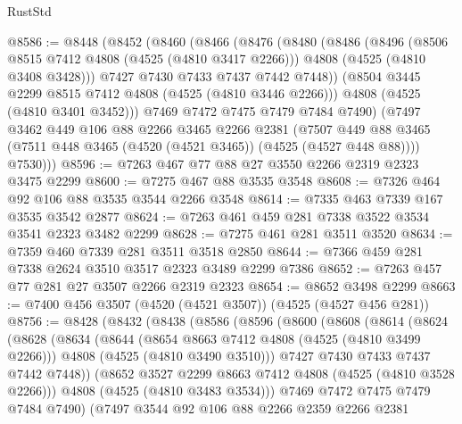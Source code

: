 \begin{lexlean}{RustStd}
\begin{coremodule}
{\begin{coremodule}
{{{{{{{{{{{{{{@8586 := @8448
    (@8452
      (@8460
        (@8466
          (@8476
            (@8480
              (@8486
                (@8496
                  (@8506 @8515 @7412 @4808 (@4525 (@4810 @3417 @2266)))
                  @4808
                  (@4525 (@4810 @3408 @3428)))
                @7427
                @7430
                @7433
                @7437
                @7442
                @7448))
            (@8504 @3445 @2299 @8515 @7412 @4808 (@4525 (@4810 @3446 @2266)))
            @4808
            (@4525 (@4810 @3401 @3452)))
          @7469
          @7472
          @7475
          @7479
          @7484
          @7490)
        (@7497
          @3462
          @449
          @106
          @88
          @2266
          @3465
          @2266
          @2381
          (@7507 @449 @88 @3465 (@7511 @448 @3465 (@4520 (@4521 @3465)) (@4525 (@4527 @448 @88))))
          @7530)))
@8596 := @7263 @467 @77 @88 @27 @3550 @2266 @2319 @2323 @3475 @2299
@8600 := @7275 @467 @88 @3535 @3548
@8608 := @7326 @464 @92 @106 @88 @3535 @3544 @2266 @3548
@8614 := @7335 @463 @7339 @167 @3535 @3542 @2877
@8624 := @7263 @461 @459 @281 @7338 @3522 @3534 @3541 @2323 @3482 @2299
@8628 := @7275 @461 @281 @3511 @3520
@8634 := @7359 @460 @7339 @281 @3511 @3518 @2850
@8644 := @7366 @459 @281 @7338 @2624 @3510 @3517 @2323 @3489 @2299 @7386
@8652 := @7263 @457 @77 @281 @27 @3507 @2266 @2319 @2323
@8654 := @8652 @3498 @2299
@8663 := @7400 @456 @3507 (@4520 (@4521 @3507)) (@4525 (@4527 @456 @281))
@8756 := @8428
    (@8432
      (@8438
        (@8586
          (@8596
            (@8600
              (@8608
                (@8614
                  (@8624
                    (@8628
                      (@8634
                        (@8644
                          (@8654 @8663 @7412 @4808 (@4525 (@4810 @3499 @2266)))
                          @4808
                          (@4525 (@4810 @3490 @3510)))
                        @7427
                        @7430
                        @7433
                        @7437
                        @7442
                        @7448))
                    (@8652 @3527 @2299 @8663 @7412 @4808 (@4525 (@4810 @3528 @2266)))
                    @4808
                    (@4525 (@4810 @3483 @3534)))
                  @7469
                  @7472
                  @7475
                  @7479
                  @7484
                  @7490)
                (@7497
                  @3544
                  @92
                  @106
                  @88
                  @2266
                  @2359
                  @2266
                  @2381
}}}}}}}}}}}}}}
\end{coremodule}}
\end{coremodule}
\end{lexlean}
